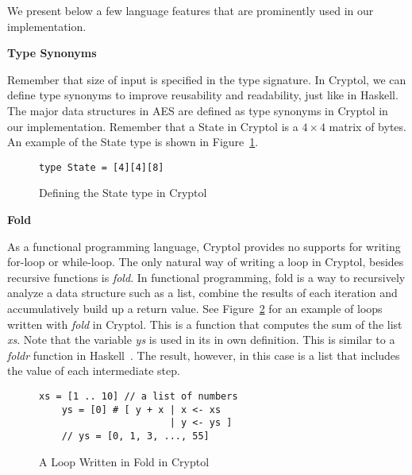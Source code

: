 \documentclass[a4paper, notitlepage]{report}
\renewcommand{\paragraph}[1]{\vspace*{1em}\noindent\textbf{#1}\hspace*{1em}}
\begin{document}

We present below a few language features that are prominently used in our
implementation.

\paragraph{Type Synonyms}

Remember that size of input is specified in the type signature.
In Cryptol, we can define type synonyms to improve reusability and readability,
just like in Haskell.
The major data structures in AES are defined as type synonyms in Cryptol in our
implementation.
Remember that a State in Cryptol is a $4 \times 4$ matrix of bytes. An example
of the State type is shown in Figure~\ref{fig:typedef}.

\begin{figure}
  \begin{lstlisting}[frame=single]
    type State = [4][4][8]
  \end{lstlisting}
  \caption{Defining the State type in Cryptol}
  \label{fig:typedef}
\end{figure}


\paragraph{Fold}

As a functional programming language, Cryptol provides no supports for writing
for-loop or
while-loop. The only natural way of writing a loop in Cryptol, besides recursive
functions is \emph{fold}.
In functional programming, fold is a way to recursively analyze a data structure
such as a list, combine the results of each iteration and accumulatively build up
a return value.
See Figure~\ref{fig:fold} for an example of loops written with \emph{fold} in
Cryptol.
This is a function that computes the sum of the list \emph{xs}.
Note that the variable \emph{ys} is used in its in own definition.
This is similar to a \emph{foldr} function in Haskell~\cite{lipovaca2011learn}.
The result, however, in this case is a list that includes the value of each
intermediate step.

\begin{figure}
  \begin{lstlisting}[frame=single]
    xs = [1 .. 10] // a list of numbers
    ys = [0] # [ y + x | x <- xs 
                       | y <- ys ]
    // ys = [0, 1, 3, ..., 55]
  \end{lstlisting}
  \caption{A Loop Written in Fold in Cryptol}
  \label{fig:fold}
\end{figure}
\end{document}
